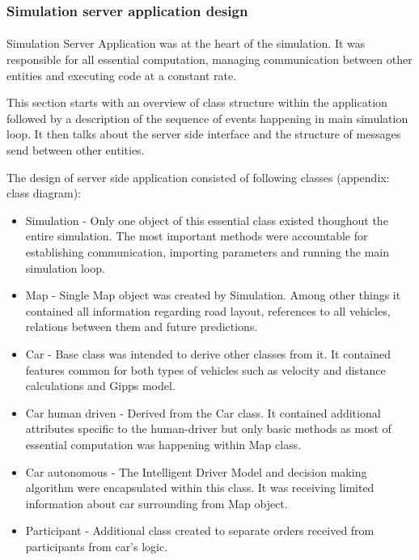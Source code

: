 \documentclass[11pt,english]{article}
\begin{document}
\subsubsection{Simulation server application design}
\paragraph{}

Simulation Server Application was at the heart of the simulation. It was responsible for all essential computation, managing communication between other entities and executing code at a constant rate.
\par
This section starts with an overview of class structure within the application followed by a description of the sequence of events happening in main simulation loop. It then talks about the server side interface and the structure of messages send between other entities.

\par

The design of server side application consisted of following classes (appendix: class diagram):

\begin{itemize}
\item Simulation - Only one object of this essential class existed thoughout the entire simulation. The most important methods were accountable for establishing communication, importing parameters and running the main simulation loop.
\item Map - Single Map object was created by Simulation. Among other things it contained all information regarding road layout, references to all vehicles, relations between them and future predictions. 
\item Car - Base class was intended to derive other classes from it. It contained features common for both types of vehicles such as velocity and distance calculations and Gipps model.
\item Car human driven - Derived from the Car class. It contained additional attributes specific to the human-driver but only basic methods as most of essential computation was happening within Map class.
\item Car autonomous - The Intelligent Driver Model and decision making algorithm were encapsulated within this class. It was receiving limited information about car surrounding from Map object.
\item Participant - Additional class created to separate orders received from participants from car's logic.
\end{itemize}
\end{document}
